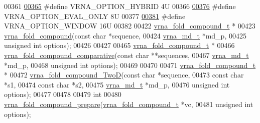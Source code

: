 \begin{DoxyCode}
00361 
\mbox{\hyperlink{group__fold__compound_ga8f681fa12b8d4b348bf58415fd1fc82f}{00365}} \textcolor{preprocessor}{#define VRNA\_OPTION\_HYBRID          4U}
00366 
\mbox{\hyperlink{group__fold__compound_ga61469c423131552c8483229f8b6c7e0e}{00376}} \textcolor{preprocessor}{#define VRNA\_OPTION\_EVAL\_ONLY       8U}
00377 
\mbox{\hyperlink{group__fold__compound_ga2b2a8009ccdccc3eb1571556261aee8e}{00381}} \textcolor{preprocessor}{#define VRNA\_OPTION\_WINDOW          16U}
00382 
00422 \mbox{\hyperlink{group__fold__compound_structvrna__fc__s}{vrna\_fold\_compound\_t}} *
00423 \mbox{\hyperlink{group__fold__compound_ga6601d994ba32b11511b36f68b08403be}{vrna\_fold\_compound}}(\textcolor{keyword}{const} \textcolor{keywordtype}{char}   *sequence,
00424                    \mbox{\hyperlink{group__model__details_structvrna__md__s}{vrna\_md\_t}}    *md\_p,
00425                    \textcolor{keywordtype}{unsigned} \textcolor{keywordtype}{int} options);
00426 
00427 
00465 \mbox{\hyperlink{group__fold__compound_structvrna__fc__s}{vrna\_fold\_compound\_t}} *
00466 \mbox{\hyperlink{group__fold__compound_gad6bacc816af274922b13d947f708aa0c}{vrna\_fold\_compound\_comparative}}(\textcolor{keyword}{const} \textcolor{keywordtype}{char}   **sequences,
00467                                \mbox{\hyperlink{group__model__details_structvrna__md__s}{vrna\_md\_t}}    *md\_p,
00468                                \textcolor{keywordtype}{unsigned} \textcolor{keywordtype}{int} options);
00469 
00470 
00471 \mbox{\hyperlink{group__fold__compound_structvrna__fc__s}{vrna\_fold\_compound\_t}} *
00472 \mbox{\hyperlink{group__fold__compound_ga9d24b196753b4f9f03774f11661510f5}{vrna\_fold\_compound\_TwoD}}(\textcolor{keyword}{const} \textcolor{keywordtype}{char}    *sequence,
00473                         \textcolor{keyword}{const} \textcolor{keywordtype}{char}    *s1,
00474                         \textcolor{keyword}{const} \textcolor{keywordtype}{char}    *s2,
00475                         \mbox{\hyperlink{group__model__details_structvrna__md__s}{vrna\_md\_t}}     *md\_p,
00476                         \textcolor{keywordtype}{unsigned} \textcolor{keywordtype}{int}  options);
00477 
00478 
00479 \textcolor{keywordtype}{int}
00480 \mbox{\hyperlink{group__fold__compound_ga3cd3a6a54a40e6d6eeb7b80c9ebdf977}{vrna\_fold\_compound\_prepare}}(\mbox{\hyperlink{group__fold__compound_structvrna__fc__s}{vrna\_fold\_compound\_t}} *vc,
00481                            \textcolor{keywordtype}{unsigned} \textcolor{keywordtype}{int}         options);

\end{DoxyCode}
